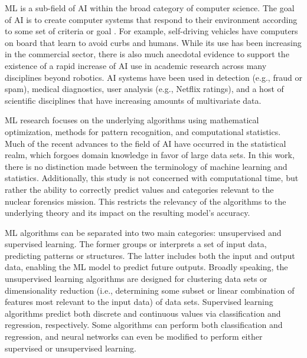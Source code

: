  \Gls{ML} is a sub-field of \gls{AI} within the broad category of
computer science. The goal of \gls{AI} is to create computer systems that
respond to their environment according to some set of criteria or goal
\cite{changingml}.  For example, self-driving vehicles have computers on board
that learn to avoid curbs and humans. While its use has been increasing in the
commercial sector, there is also much anecdotal evidence to support the
existence of a rapid increase of \gls{AI} use in academic research across many
disciplines beyond robotics. \gls{AI} systems have been used in detection
(e.g., fraud or spam), medical diagnostics, user analysis (e.g., Netflix
ratings), and a host of scientific disciplines that have increasing amounts of
multivariate data.

\gls{ML} research focuses on the underlying algorithms using mathematical
optimization, methods for pattern recognition, and computational statistics.
Much of the recent advances to the field of \gls{AI} have occurred in the
statistical realm, which forgoes domain knowledge in favor of large data sets.
In this work, there is no distinction made between the terminology of machine
learning and statistics.  Additionally, this study is not concerned with
computational time, but rather the ability to correctly predict values and
categories relevant to the nuclear forensics mission. This restricts the
relevancy of the algorithms to the underlying theory and its impact on the
resulting model's accuracy. 

\gls{ML} algorithms can be separated into two main categories: unsupervised and
supervised learning.  The former groups or interprets a set of input data,
predicting patterns or structures. The latter includes both the input and
output data, enabling the \gls{ML} model to predict future outputs.  Broadly
speaking, the unsupervised learning algorithms are designed for clustering data
sets or dimensionality reduction (i.e., determining some subset or linear
combination of features most relevant to the input data) of data sets.
Supervised learning algorithms predict both discrete and continuous values via
classification and regression, respectively. Some algorithms can perform both
classification and regression, and neural networks can even be modified to
perform either supervised or unsupervised learning.\cite{elements_stats} 

